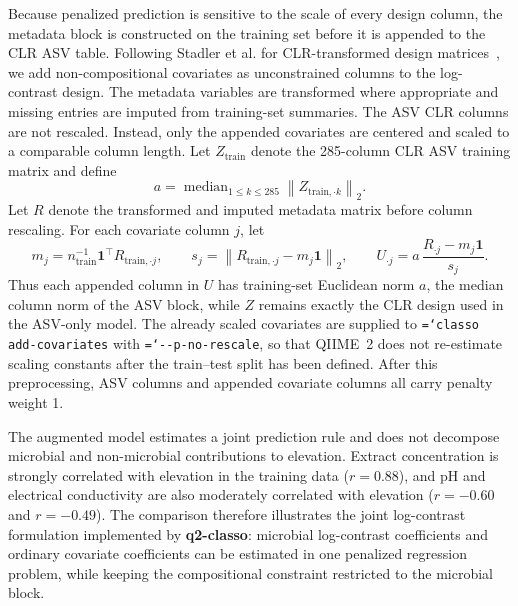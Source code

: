 \documentclass[11pt,a4paper]{article}
\newcommand{\code}[1]{\allowbreak\texttt{\hyphenchar\font=`\-\relax #1}}
\newcommand{\pkg}[1]{\textbf{#1}}
\begin{document}
Because penalized prediction is sensitive to the scale of every design column,
the metadata block is constructed on the training set before it is appended to
the CLR ASV table. Following Stadler et al. for CLR-transformed design
matrices~\citep{stadler2024predictive}, we add non-compositional covariates as
unconstrained columns to the log-contrast design. The metadata variables are
transformed where appropriate and missing entries are imputed from training-set
summaries. The ASV CLR columns are not rescaled. Instead, only the appended
covariates are centered and scaled to a comparable column length. Let
$Z_{\mathrm{train}}$ denote the 285-column CLR ASV training matrix and define
\[
    a = \operatorname{median}_{1\le k\le 285}
        \left\lVert Z_{\mathrm{train},\cdot k}\right\rVert_2 .
\]
Let $R$ denote the transformed and imputed metadata matrix before column
rescaling. For each covariate column $j$, let
\[
    m_j = n_{\mathrm{train}}^{-1}\mathbf{1}^{\top}R_{\mathrm{train},\cdot j},
    \qquad
    s_j = \left\lVert R_{\mathrm{train},\cdot j}
          - m_j \mathbf{1}\right\rVert_2,
    \qquad
    U_{\cdot j} =
        a\,\frac{R_{\cdot j} - m_j \mathbf{1}}{s_j}.
\]
Thus each appended column in $U$ has training-set Euclidean norm $a$, the median
column norm of the ASV block, while $Z$ remains exactly the CLR design used in
the ASV-only model. The already scaled covariates are supplied to
\code{classo add-covariates} with \code{-{}-p-no-rescale}, so that QIIME~2 does
not re-estimate scaling constants after the train--test split has been defined.
After this preprocessing, ASV columns and appended covariate columns all carry
penalty weight 1.

The augmented model estimates a joint prediction rule and does not decompose
microbial and non-microbial contributions to elevation. Extract concentration
is strongly correlated with elevation in the training data ($r=0.88$), and pH
and electrical conductivity are also moderately correlated with elevation
($r=-0.60$ and $r=-0.49$). The comparison therefore illustrates the joint
log-contrast formulation implemented by \pkg{q2-classo}: microbial log-contrast
coefficients and ordinary covariate coefficients can be estimated in one
penalized regression problem, while keeping the compositional constraint
restricted to the microbial block.
\end{document}
